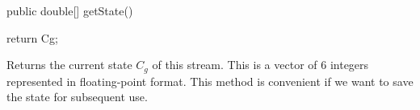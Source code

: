 \begin{htmlonly}
\end{htmlonly}
\begin{code}

   public double[] getState() \begin{hide} {
      return Cg;
   }\end{hide}
\end{code}
 \begin{tabb} Returns the current state $C_g$ of this stream.
  This is a vector of 6 integers represented in floating-point format.
  This method is convenient if we want to save the state for 
  subsequent use.  
 \end{tabb}
\begin{htmlonly}
\end{htmlonly}

